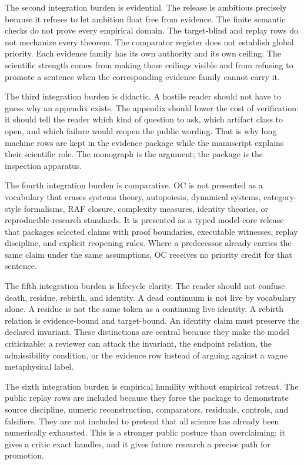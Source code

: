 The second integration burden is evidential. The release is ambitious precisely because it refuses to let ambition float free from evidence. The finite semantic checks do not prove every empirical domain. The target-blind and replay rows do not mechanize every theorem. The comparator register does not establish global priority. Each evidence family has its own authority and its own ceiling. The scientific strength comes from making those ceilings visible and from refusing to promote a sentence when the corresponding evidence family cannot carry it.


The third integration burden is didactic. A hostile reader should not have to guess why an appendix exists. The appendix should lower the cost of verification: it should tell the reader which kind of question to ask, which artifact class to open, and which failure would reopen the public wording. That is why long machine rows are kept in the evidence package while the manuscript explains their scientific role. The monograph is the argument; the package is the inspection apparatus.


The fourth integration burden is comparative. OC is not presented as a vocabulary that erases systems theory, autopoiesis, dynamical systems, category-style formalisms, RAF closure, complexity measures, identity theories, or reproducible-research standards. It is presented as a typed model-core release that packages selected claims with proof boundaries, executable witnesses, replay discipline, and explicit reopening rules. Where a predecessor already carries the same claim under the same assumptions, OC receives no priority credit for that sentence.


The fifth integration burden is lifecycle clarity. The reader should not confuse death, residue, rebirth, and identity. A dead continuum is not live by vocabulary alone. A residue is not the same token as a continuing live identity. A rebirth relation is evidence-bound and target-bound. An identity claim must preserve the declared invariant. These distinctions are central because they make the model criticizable: a reviewer can attack the invariant, the endpoint relation, the admissibility condition, or the evidence row instead of arguing against a vague metaphysical label.


The sixth integration burden is empirical humility without empirical retreat. The public replay rows are included because they force the package to demonstrate source discipline, numeric reconstruction, comparators, residuals, controls, and falsifiers. They are not included to pretend that all science has already been numerically exhausted. This is a stronger public posture than overclaiming: it gives a critic exact handles, and it gives future research a precise path for promotion.


